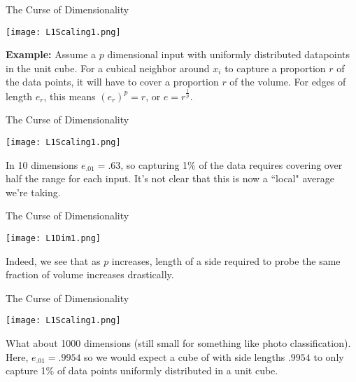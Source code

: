\documentclass[10pt,handout]{beamer}
\begin{document}
\begin{frame}[fragile]{The Curse of Dimensionality}
   \begin{minipage}[t][0.5\textheight][t]{\textwidth}
    \centering
     \texttt{[image: L1Scaling1.png]}
  \end{minipage}
  \vfill
  \begin{minipage}[t][0.5\textheight][t]{\textwidth}
\textbf{Example:} Assume a $p$ dimensional input with uniformly distributed datapoints in the unit cube. For a cubical neighbor around $x_i$ to capture a proportion $r$ of the data points, it will have to cover a proportion $r$ of the volume. For edges of length $e_r$, this means $(e_r)^p = r$, or $e = r^{\frac1p}$.
 \end{minipage}
\end{frame}


\begin{frame}[fragile]{The Curse of Dimensionality}
   \begin{minipage}[t][0.5\textheight][t]{\textwidth}
    \centering
     \texttt{[image: L1Scaling1.png]}
  \end{minipage}
  \vfill
  \begin{minipage}[t][0.3\textheight][t]{\textwidth}
In 10 dimensions $e_{.01} = .63$, so capturing 1\% of the data requires covering over half the range for each input. It's not clear that this is now a ``local" average we're taking.  
 \end{minipage}
\end{frame}


\begin{frame}[fragile]{The Curse of Dimensionality}
   \begin{minipage}[t][0.7\textheight][t]{\textwidth}
    \centering
     \texttt{[image: L1Dim1.png]}
  \end{minipage}
  \vfill
  \begin{minipage}[t][0.3\textheight][t]{\textwidth}
Indeed, we see that as $p$ increases, length of a side required to probe the same fraction of volume increases drastically. 
 \end{minipage}
\end{frame}


\begin{frame}[fragile]{The Curse of Dimensionality}
   \begin{minipage}[t][0.5\textheight][t]{\textwidth}
    \centering
     \texttt{[image: L1Scaling1.png]}
  \end{minipage}
  \vfill
  \begin{minipage}[t][0.3\textheight][t]{\textwidth}
What about 1000 dimensions (still small for something like photo classification).  Here, $e_{.01} = .9954$ so we would expect a cube of with side lengths $.9954$ to only capture 1\% of data points uniformly distributed in a unit cube. 
 \end{minipage}
\end{frame}
\end{document}
